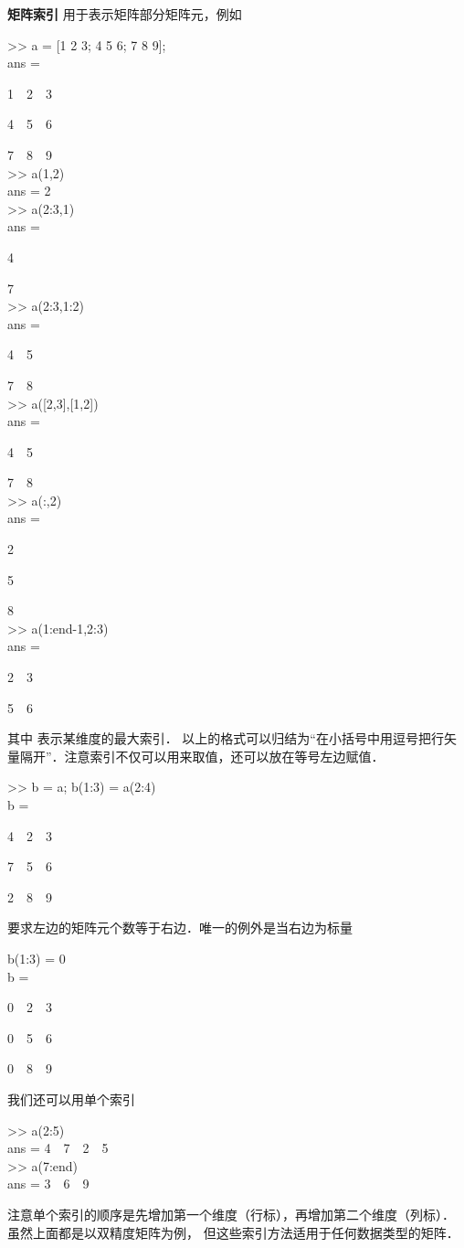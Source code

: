 \textbf{矩阵索引} 用于表示矩阵部分矩阵元，例如
\begin{Command}
>> a = [1 2 3; 4 5 6; 7 8 9]; \\
ans = \par
1\ \ 2\ \ 3 \par
4\ \ 5\ \ 6 \par
7\ \ 8\ \ 9 \\
>> a(1,2) \\
ans = 2 \\
>> a(2:3,1) \\
ans = \par
4 \par
7 \\
>> a(2:3,1:2) \\
ans = \par
4\ \ 5 \par
7\ \ 8 \\
>> a([2,3],[1,2]) \\
ans = \par
4\ \ 5 \par
7\ \ 8 \\
>> a(:,2) \\
ans = \par
2 \par
5 \par
8 \\
>> a(1:end-1,2:3) \\
ans = \par
2\ \ 3 \par
5\ \ 6
\end{Command}
其中  表示某维度的最大索引． 以上的格式可以归结为“在小括号中用逗号把行矢量隔开”．注意索引不仅可以用来取值，还可以放在等号左边赋值．
\begin{Command}
>> b = a; b(1:3) = a(2:4) \\
b = \par
4\ \ 2\ \ 3 \par
7\ \ 5\ \ 6 \par
2\ \ 8\ \ 9
\end{Command}
要求左边的矩阵元个数等于右边．唯一的例外是当右边为标量
\begin{Command}
b(1:3) = 0 \\
b = \par
0\ \ 2\ \ 3 \par
0\ \ 5\ \ 6 \par
0\ \ 8\ \ 9 
\end{Command}
我们还可以用单个索引
\begin{Command}
>> a(2:5)\\
ans = 4\ \ 7\ \ 2\ \ 5 \\
>> a(7:end)\\
ans = 3\ \ 6\ \ 9
\end{Command}
注意单个索引的顺序是先增加第一个维度（行标），再增加第二个维度（列标）． 虽然上面都是以双精度矩阵为例， 但这些索引方法适用于任何数据类型的矩阵．

